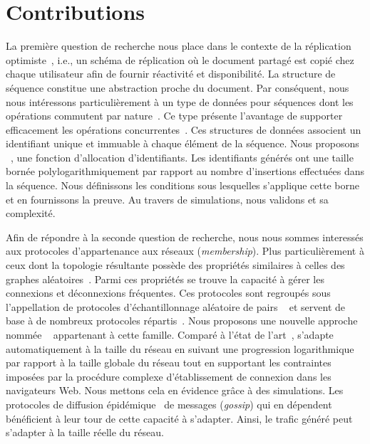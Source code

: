 
\section{Contributions}

La première question de recherche nous place dans le contexte de la réplication
optimiste~\cite{demers1987epidemic, saito2005optimistic}, i.e., un schéma de
réplication où le document partagé est copié chez chaque utilisateur afin de
fournir réactivité et disponibilité. La structure de séquence constitue une
abstraction proche du document. Par conséquent, nous nous intéressons
particulièrement à un type de données pour séquences dont les opérations
commutent par nature~\cite{burckhardt2014replicated, shapiro2011comprehensive,
  shapiro2011conflict, zawirski2015dependable}. Ce type présente l'avantage de
supporter efficacement les opérations concurrentes~\cite{ahmed2015evaluation,
  ahmed2011evaluating}. Ces structures de données associent un identifiant
unique et immuable à chaque élément de la séquence. Nous proposons
\LSEQ~\cite{nedelec2013concurrency, nedelec2013lseq}, une fonction d'allocation
d'identifiants. Les identifiants générés ont une taille bornée
polylogarithmiquement par rapport au nombre d'insertions effectuées dans la
séquence. Nous définissons les conditions sous lesquelles s'applique cette borne
et en fournissons la preuve. Au travers de simulations, nous validons \LSEQ et
sa complexité.

Afin de répondre à la seconde question de recherche, nous nous sommes interessés
aux protocoles d'appartenance aux réseaux (\emph{membership}). Plus
particulièrement à ceux dont la topologie résultante possède des propriétés
similaires à celles des graphes aléatoires~\cite{erdos1959random}. Parmi ces
propriétés se trouve la capacité à gérer les connexions et déconnexions
fréquentes. Ces protocoles sont regroupés sous l'appellation de \og protocoles
d'échantillonnage aléatoire de pairs \fg~\cite{jelasity2004peer,
  jelasity2007gossip} et servent de base à de nombreux protocoles
répartis~\cite{dabek2004vivaldi, folz2016cyclades, montresor2005chord}. Nous
proposons une nouvelle approche nommée \SPRAY~\cite{nedelec2015spray}
appartenant à cette famille. Comparé à l'état de
l'art~\cite{eugster2003lightweight, ganesh2001scamp, jelasity2007gossip,
  leitao2007dependable, tolgyeski2009adaptive, voulgaris2005cyclon}, \SPRAY
s'adapte automatiquement à la taille du réseau en suivant une progression
logarithmique par rapport à la taille globale du réseau tout en supportant les
contraintes imposées par la procédure complexe d'établissement de connexion dans
les navigateurs Web. Nous mettons cela en évidence grâce à des simulations.  Les
protocoles de diffusion épidémique~\cite{birman1999bimodal} de messages
(\emph{gossip}) qui en dépendent bénéficient à leur tour de cette capacité à
s'adapter. Ainsi, le trafic généré peut s'adapter à la taille réelle du réseau.

